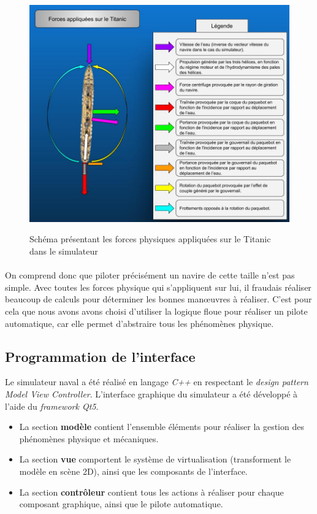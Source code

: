 \documentclass[a4paper,11pt]{article}
\begin{document}
    \begin{figure}[H]
        \begin{center}
            \caption{Schéma présentant les forces physiques appliquées sur le Titanic dans le simulateur}
            \includegraphics[scale=0.56]{assets/Isaac_vs_Titanic.jpg}
            \label{fig:titanicForces}
        \end{center}
    \end{figure}
    \paragraph{}
    On comprend donc que piloter précisément un navire de cette taille n'est pas simple. Avec toutes les forces physique qui s'appliquent sur lui, il fraudais réaliser beaucoup de calculs pour déterminer les bonnes manœuvres à réaliser. C'est pour cela que nous avons avons choisi d'utiliser la logique floue pour réaliser un pilote automatique, car elle permet d’abstraire tous les phénomènes physique.

    \subsection{Programmation de l'interface}
    Le simulateur naval a été réalisé en langage \textit{C++} en respectant le \textit{design pattern Model View Controller}. L'interface graphique du simulateur a été développé à l'aide du \textit{framework Qt5}.

    \begin{itemize}
        \item La section \textbf{modèle} contient l'ensemble éléments pour réaliser la gestion des phénomènes physique et mécaniques.
        \item La section \textbf{vue} comportent le système de virtualisation (transforment le modèle en scène 2D), ainsi que les composants de l'interface.
        \item La section \textbf{contrôleur} contient tous les actions à réaliser pour chaque composant graphique, ainsi que le pilote automatique.
    \end{itemize}
\end{document}
